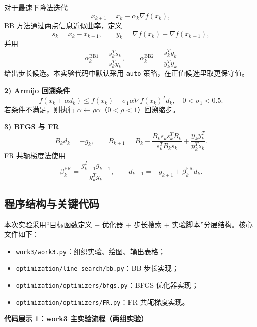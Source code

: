 \documentclass[12pt,a4paper]{ctexart}
\begin{document}
对于最速下降法迭代
\[
x_{k+1}=x_k-\alpha_k \nabla f(x_k),
\]
BB 方法通过两点信息近似曲率，定义
\[
s_k=x_k-x_{k-1},\qquad y_k=\nabla f(x_k)-\nabla f(x_{k-1}),
\]
并用
\[
\alpha_k^{\text{BB1}}=\frac{s_k^Ts_k}{s_k^Ty_k},\qquad
\alpha_k^{\text{BB2}}=\frac{s_k^Ty_k}{y_k^Ty_k}
\]
给出步长候选。本实验代码中默认采用 \texttt{auto} 策略，在正值候选里取更保守值。

\textbf{2) Armijo 回溯条件}
\[
f(x_k+\alpha d_k)\le f(x_k)+\sigma_1\alpha \nabla f(x_k)^Td_k,\quad
0<\sigma_1<0.5.
\]
若条件不满足，则执行 \(\alpha\leftarrow \rho\alpha\)（\(0<\rho<1\)）回溯缩步。

\textbf{3) BFGS 与 FR}
\[
B_k d_k=-g_k,\qquad
B_{k+1}=B_k-\frac{B_ks_ks_k^TB_k}{s_k^TB_ks_k}+\frac{y_ky_k^T}{y_k^Ts_k}.
\]
FR 共轭梯度法使用
\[
\beta_k^{\text{FR}}=\frac{g_{k+1}^Tg_{k+1}}{g_k^Tg_k},\qquad
d_{k+1}=-g_{k+1}+\beta_k^{\text{FR}}d_k.
\]

\subsection{程序结构与关键代码}
本次实验采用“目标函数定义 + 优化器 + 步长搜索 + 实验脚本”分层结构。核心文件如下：
\begin{itemize}
  \item \texttt{work3/work3.py}：组织实验、绘图、输出表格；
  \item \texttt{optimization/line\_search/bb.py}：BB 步长实现；
  \item \texttt{optimization/optimizers/bfgs.py}：BFGS 优化器实现；
  \item \texttt{optimization/optimizers/FR.py}：FR 共轭梯度实现。
\end{itemize}

\textbf{代码展示 1：work3 主实验流程（两组实验）}

\end{document}
